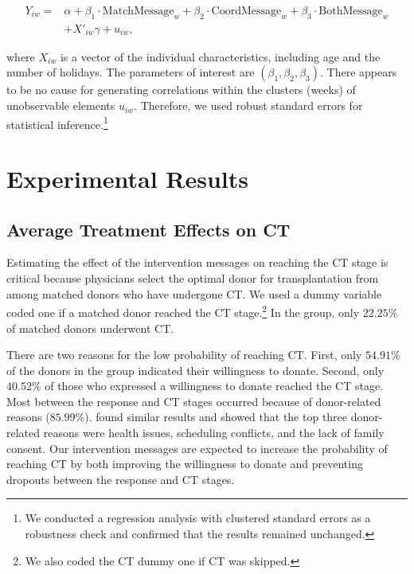 \documentclass[12pt, a4paper]{article}
\newcommand{\revise}[1]{{\color{red}{#1}}}
\begin{document}
\begin{equation}
  \begin{split}
  Y_{iw} =& \alpha + \beta_1 \cdot \text{MatchMessage}_{w}
  + \beta_2 \cdot \text{CoordMessage}_{w} + \beta_3 \cdot \text{BothMessage}_{w} \\
  &+ X'_{iw} \gamma + u_{iw},
  \end{split}\label{eq:reg}
\end{equation}

\noindent
where \(X_{iw}\) is a vector of the individual characteristics, including age and the number of holidays. The parameters of interest are \((\beta_1, \beta_2, \beta_3)\). There appears to be no cause for generating correlations within the clusters (weeks) of unobservable elements \(u_{iw}\). Therefore, we used robust standard errors for statistical inference.\footnote{We conducted a regression analysis with clustered standard errors as a robustness check and confirmed that the results remained unchanged.}

\hypertarget{result}{%
\section{Experimental Results}\label{result}}

\hypertarget{main}{%
\subsection{Average Treatment Effects on CT}\label{main}}

Estimating the effect of the intervention messages on reaching the CT stage is critical because physicians select the optimal donor for transplantation from among matched donors who have undergone CT. We used a dummy variable coded one if a matched donor reached the CT stage.\footnote{We also coded the CT dummy one if CT was skipped.} In the \revise{StatusQuo} group, only \(22.25\)\% of matched donors underwent CT.

There are two reasons for the low probability of reaching CT. First, only \(54.91\)\% of the donors in the \revise{StatusQuo} group indicated their willingness to donate. Second, only \(40.52\)\% of those who expressed a willingness to donate reached the CT stage. Most \revise{dropout} between the response and CT stages occurred because of donor-related reasons (\(85.99\)\%). \citet{Hirakawa2018} found similar results and showed that the top three donor-related reasons were health issues, scheduling conflicts, and the lack of family consent. Our intervention messages are expected to increase the probability of reaching CT by both improving the willingness to donate and preventing dropouts between the response and CT stages.
\end{document}
